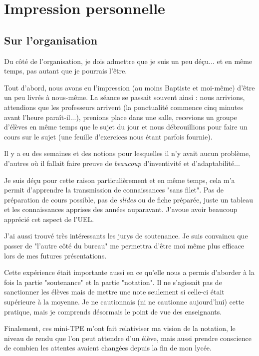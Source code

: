 \section{Impression personnelle}

\subsection{Sur l'organisation}

Du côté de l'organisation, je dois admettre que je suis un peu déçu... et en même temps, pas autant que je pourrais
l'être.

Tout d'abord, nous avons eu l'impression (au moins Baptiste et moi-même) d'être un peu livrés à nous-même. La séance se
passait souvent ainsi : nous arrivions, attendions que les professeurs arrivent (la ponctualité commence cinq minutes avant
l'heure paraît-il...), prenions place dans une salle, recevions un groupe d'élèves en même temps que le sujet du jour et
nous débrouillions pour faire un cours sur le sujet (une feuille d'exercices nous étant parfois fournie).

Il y a eu des semaines et des notions pour lesquelles il n'y avait aucun problème, d'autres où il fallait faire preuve
de \textit{beaucoup} d'inventivité et d'adaptabilité...

Je suis déçu pour cette raison particulièrement et en même temps, cela m'a permit d'apprendre la transmission de
connaissances "sans filet". Pas de préparation de cours possible, pas de \textit{slides} ou de fiche préparée, juste un tableau
et les connaissances apprises des années auparavant. J'avoue avoir beaucoup apprécié cet aspect de l'UEL.

J'ai aussi trouvé très intéressants les jurys de soutenance. Je suis convaincu que passer de "l'autre côté du bureau" me
permettra d'être moi même plus efficace lors de mes futures présentations.

Cette expérience était importante aussi en ce qu'elle nous a permis d'aborder à la fois la partie "soutenance" et la
partie "notation". Il ne s'agissait pas de sanctionner les élèves mais de mettre une note seulement si celle-ci était
supérieure à la moyenne. Je ne cautionnais (ni ne cautionne aujourd'hui) cette pratique, mais je comprends désormais le
point de vue des enseignants.

Finalement, ces mini-TPE m'ont fait relativiser ma vision de la notation, le niveau de rendu que l'on peut attendre d'un
élève, mais aussi prendre conscience de combien les attentes avaient changées depuis la fin de mon lycée.

